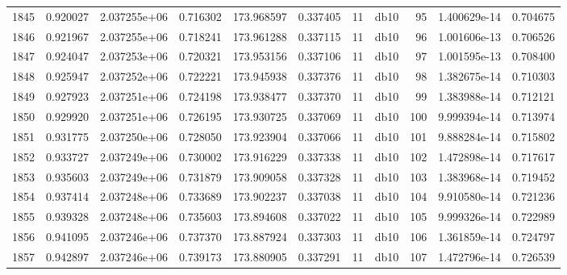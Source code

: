 \begin{tabular}{lrrrrrrlrrr}
1845 &    0.920027 &        2.037255e+06 &  0.716302 &              173.968597 &    0.337405 &      11 &         db10 &     95 &   1.400629e-14 &      0.704675 \\
1846 &    0.921967 &        2.037255e+06 &  0.718241 &              173.961288 &    0.337115 &      11 &         db10 &     96 &   1.001606e-13 &      0.706526 \\
1847 &    0.924047 &        2.037253e+06 &  0.720321 &              173.953156 &    0.337106 &      11 &         db10 &     97 &   1.001595e-13 &      0.708400 \\
1848 &    0.925947 &        2.037252e+06 &  0.722221 &              173.945938 &    0.337376 &      11 &         db10 &     98 &   1.382675e-14 &      0.710303 \\
1849 &    0.927923 &        2.037251e+06 &  0.724198 &              173.938477 &    0.337370 &      11 &         db10 &     99 &   1.383988e-14 &      0.712121 \\
1850 &    0.929920 &        2.037251e+06 &  0.726195 &              173.930725 &    0.337069 &      11 &         db10 &    100 &   9.999394e-14 &      0.713974 \\
1851 &    0.931775 &        2.037250e+06 &  0.728050 &              173.923904 &    0.337066 &      11 &         db10 &    101 &   9.888284e-14 &      0.715802 \\
1852 &    0.933727 &        2.037249e+06 &  0.730002 &              173.916229 &    0.337338 &      11 &         db10 &    102 &   1.472898e-14 &      0.717617 \\
1853 &    0.935603 &        2.037249e+06 &  0.731879 &              173.909058 &    0.337328 &      11 &         db10 &    103 &   1.383968e-14 &      0.719452 \\
1854 &    0.937414 &        2.037248e+06 &  0.733689 &              173.902237 &    0.337038 &      11 &         db10 &    104 &   9.910580e-14 &      0.721236 \\
1855 &    0.939328 &        2.037248e+06 &  0.735603 &              173.894608 &    0.337022 &      11 &         db10 &    105 &   9.999326e-14 &      0.722989 \\
1856 &    0.941095 &        2.037246e+06 &  0.737370 &              173.887924 &    0.337303 &      11 &         db10 &    106 &   1.361859e-14 &      0.724797 \\
1857 &    0.942897 &        2.037246e+06 &  0.739173 &              173.880905 &    0.337291 &      11 &         db10 &    107 &   1.472796e-14 &      0.726539 \\

\end{tabular}
